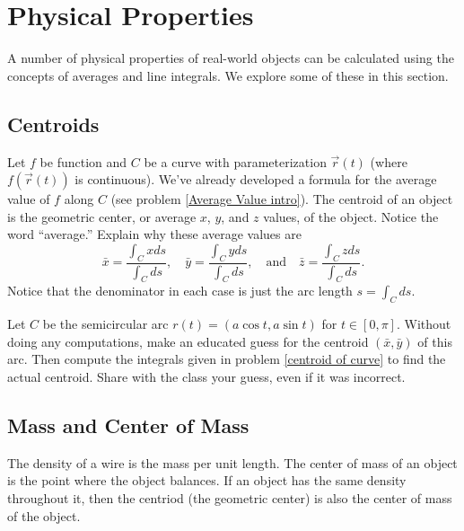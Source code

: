 \section{Physical Properties}

A number of physical properties of real-world objects can be calculated using the concepts of averages and line integrals.  We explore some of these in this section.

\subsection{Centroids}%
%
\begin{problem}[Centroid]\label{centroid of curve}
 Let $f$ be function and $C$ be a curve with parameterization $\vec r(t)$ (where $f(\vec r(t))$ is continuous).  We've already developed a formula for the average value of $f$ along $C$ (see problem \ref{Average Value intro}). The centroid of an object is the geometric center, or average $x$, $y$, and $z$ values, of the object.  Notice the word ``average.''  Explain why these average values are 
$$
\bar x = \frac{\int_C x ds}{\int_C  ds},\quad
\bar y = \frac{\int_C y ds}{\int_C  ds},\quad 
\text{and}\quad
\bar z = \frac{\int_C z ds}{\int_C  ds}.
$$
Notice that the denominator in each case is just the arc length $s=\int_C ds$. 
\end{problem}


\begin{problem}\label{semicircle centroid}
 Let $C$ be the semicircular arc $r(t)=(a\cos t, a\sin t)$ for $t\in[0,\pi]$. Without doing any computations, make an educated guess for the centroid $(\bar x, \bar y)$ of this arc.  Then compute the integrals given in problem \ref{centroid of curve} to find the actual centroid. Share with the class your guess, even if it was incorrect. 
\end{problem}

\subsection{Mass and Center of Mass}
The density of a wire is the mass per unit length.  The center of mass of an object is the point where the object balances.  If an object has the same density throughout it, then the centriod (the geometric center) is also the center of mass of the object.

